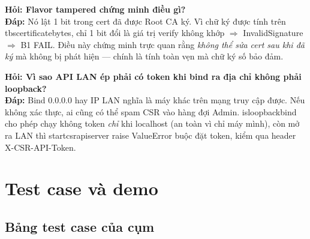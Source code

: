 \documentclass[12pt,a4paper]{article}
\newcommand{\code}[1]{{\ttfamily\small\def\_{\textunderscore\discretionary{}{}{}}#1}}
\begin{document}
\begin{qabox}
\textbf{Hỏi: Flavor \code{tampered} chứng minh điều gì?}\\
\textbf{Đáp:} Nó lật 1 bit trong cert đã được Root CA ký. Vì chữ ký được tính
trên \code{tbs\_certificate\_bytes}, chỉ 1 bit đổi là giá trị verify không khớp
$\Rightarrow$ \code{InvalidSignature} $\Rightarrow$ B1 FAIL. Điều này chứng minh
trực quan rằng \emph{không thể sửa cert sau khi đã ký} mà không bị phát hiện ---
chính là tính toàn vẹn mà chữ ký số bảo đảm.
\end{qabox}

\begin{qabox}
\textbf{Hỏi: Vì sao API LAN ép phải có token khi bind ra địa chỉ không phải
loopback?}\\
\textbf{Đáp:} Bind \code{0.0.0.0} hay IP LAN nghĩa là máy khác trên mạng truy cập
được. Nếu không xác thực, ai cũng có thể spam CSR vào hàng đợi Admin.
\code{\_is\_loopback\_bind} cho phép chạy không token \emph{chỉ} khi localhost
(an toàn vì chỉ máy mình), còn mở ra LAN thì \code{start\_csr\_api\_server} raise
\code{ValueError} buộc đặt token, kiểm qua header \code{X-CSR-API-Token}.
\end{qabox}

\section{Test case và demo}

\subsection{Bảng test case của cụm}
\end{document}
